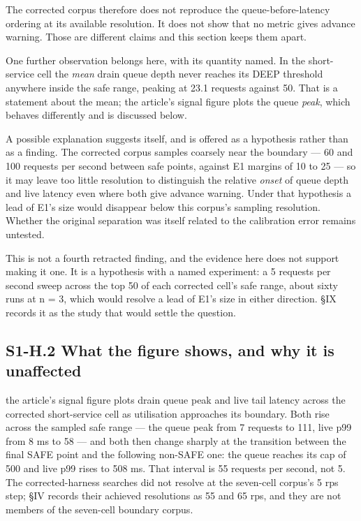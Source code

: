 \documentclass{ieeeaccess}
\begin{document}
The corrected corpus therefore does not reproduce the queue-before-latency ordering at its available resolution. It does not show that no metric gives advance warning. Those are different claims and this section keeps them apart.

One further observation belongs here, with its quantity named. In the short-service cell the \textit{mean} drain queue depth never reaches its DEEP threshold anywhere inside the safe range, peaking at 23.1 requests against 50. That is a statement about the mean; the article's signal figure plots the queue \textit{peak}, which behaves differently and is discussed below.

A possible explanation suggests itself, and is offered as a hypothesis rather than as a finding. The corrected corpus samples coarsely near the boundary --- 60 and 100 requests per second between safe points, against E1 margins of 10 to 25 --- so it may leave too little resolution to distinguish the relative \textit{onset} of queue depth and live latency even where both give advance warning. Under that hypothesis a lead of E1's size would disappear below this corpus's sampling resolution. Whether the original separation was itself related to the calibration error remains untested.

This is not a fourth retracted finding, and the evidence here does not support making it one. It is a hypothesis with a named experiment: a 5 requests per second sweep across the top 50 of each corrected cell's safe range, about sixty runs at n = 3, which would resolve a lead of E1's size in either direction. \S{}IX records it as the study that would settle the question.

\subsection*{S1-H.2 What the figure shows, and why it is unaffected}

the article's signal figure plots drain queue peak and live tail latency across the corrected short-service cell as utilisation approaches its boundary. Both rise across the sampled safe range --- the queue peak from 7 requests to 111, live p99 from 8 ms to 58 --- and both then change sharply at the transition between the final SAFE point and the following non-SAFE one: the queue reaches its cap of 500 and live p99 rises to 508 ms. That interval is 55 requests per second, not 5. The corrected-harness searches did not resolve at the seven-cell corpus's 5 rps step; \S{}IV records their achieved resolutions as 55 and 65 rps, and they are not members of the seven-cell boundary corpus.
\end{document}
